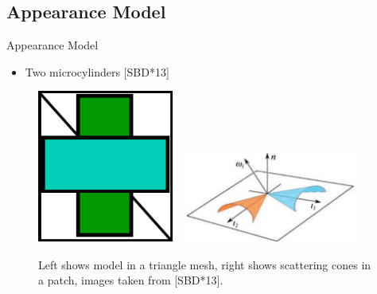 \documentclass{beamer}
\begin{document}
\subsection{Appearance Model}
\begin{frame}{Appearance Model}
\begin{itemize}
\setlength\itemsep{0.5em}
\item Two microcylinders [SBD*13]
\end{itemize}
\begin{center}
\begin{figure}
\includegraphics[width=0.4\textwidth]{img/cloth_model}
~
\includegraphics[width=0.5\textwidth]{img/microcylinders}
\caption*{\tiny{Left shows model in a triangle mesh, right shows scattering cones in a patch, images taken from [SBD*13].}}
\end{figure}
\end{center}
\end{frame}
\end{document}
